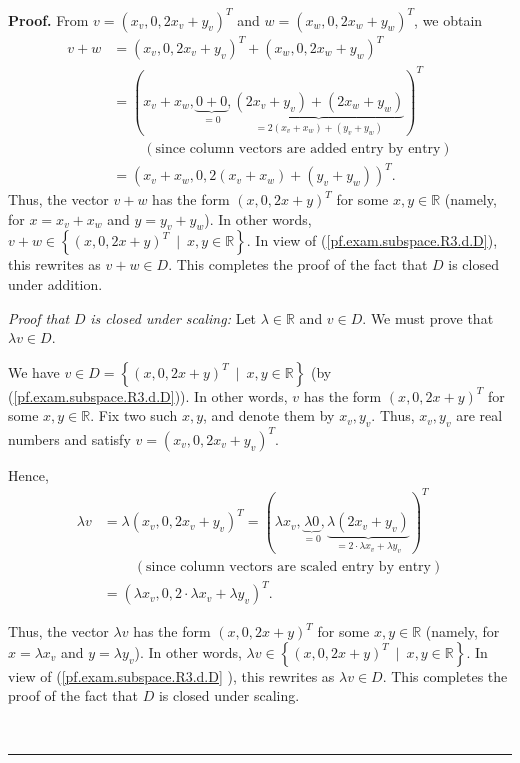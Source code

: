 \documentclass[numbers=enddot,12pt,final,onecolumn,notitlepage]{scrartcl}%
\theoremstyle{definition}
\newenvironment{proof}[1][Proof]{\noindent\textbf{#1.} }{\ \rule{0.5em}{0.5em}}
\begin{document}
\begin{proof}
From $v=\left(  x_{v},0,2x_{v}+y_{v}\right)  ^{T}$ and $w=\left(
x_{w},0,2x_{w}+y_{w}\right)  ^{T}$, we obtain%
\begin{align*}
v+w  &  =\left(  x_{v},0,2x_{v}+y_{v}\right)  ^{T}+\left(  x_{w}%
,0,2x_{w}+y_{w}\right)  ^{T}\\
&  =\left(  x_{v}+x_{w},\underbrace{0+0}_{=0},\underbrace{\left(  2x_{v}%
+y_{v}\right)  +\left(  2x_{w}+y_{w}\right)  }_{=2\left(  x_{v}+x_{w}\right)
+\left(  y_{v}+y_{w}\right)  }\right)  ^{T}\\
&  \ \ \ \ \ \ \ \ \ \ \left(  \text{since column vectors are added entry by
entry}\right) \\
&  =\left(  x_{v}+x_{w},0,2\left(  x_{v}+x_{w}\right)  +\left(  y_{v}%
+y_{w}\right)  \right)  ^{T}.
\end{align*}
Thus, the vector $v+w$ has the form $\left(  x,0,2x+y\right)  ^{T}$ for some
$x,y\in\mathbb{R}$ (namely, for $x=x_{v}+x_{w}$ and $y=y_{v}+y_{w}$). In other
words, $v+w\in\left\{  \left(  x,0,2x+y\right)  ^{T}\ \mid\ x,y\in
\mathbb{R}\right\}  $. In view of (\ref{pf.exam.subspace.R3.d.D}), this
rewrites as $v+w\in D$. This completes the proof of the fact that $D$ is
closed under addition.

\textit{Proof that }$D$ \textit{is closed under scaling:} Let $\lambda
\in\mathbb{R}$ and $v\in D$. We must prove that $\lambda v\in D$.

We have $v\in D=\left\{  \left(  x,0,2x+y\right)  ^{T}\ \mid\ x,y\in
\mathbb{R}\right\}  $ (by (\ref{pf.exam.subspace.R3.d.D})). In other words,
$v$ has the form $\left(  x,0,2x+y\right)  ^{T}$ for some $x,y\in\mathbb{R}$.
Fix two such $x,y$, and denote them by $x_{v},y_{v}$. Thus, $x_{v},y_{v}$ are
real numbers and satisfy $v=\left(  x_{v},0,2x_{v}+y_{v}\right)  ^{T}$.

Hence,%
\begin{align*}
\lambda v  &  =\lambda\left(  x_{v},0,2x_{v}+y_{v}\right)  ^{T}=\left(
\lambda x_{v},\underbrace{\lambda0}_{=0},\underbrace{\lambda\left(
2x_{v}+y_{v}\right)  }_{=2\cdot\lambda x_{v}+\lambda y_{v}}\right)  ^{T}\\
&  \ \ \ \ \ \ \ \ \ \ \left(  \text{since column vectors are scaled entry by
entry}\right) \\
&  =\left(  \lambda x_{v},0,2\cdot\lambda x_{v}+\lambda y_{v}\right)  ^{T}.
\end{align*}


Thus, the vector $\lambda v$ has the form $\left(  x,0,2x+y\right)  ^{T}$ for
some $x,y\in\mathbb{R}$ (namely, for $x=\lambda x_{v}$ and $y=\lambda y_{v}$).
In other words, $\lambda v\in\left\{  \left(  x,0,2x+y\right)  ^{T}%
\ \mid\ x,y\in\mathbb{R}\right\}  $. In view of (\ref{pf.exam.subspace.R3.d.D}%
), this rewrites as $\lambda v\in D$. This completes the proof of the fact
that $D$ is closed under scaling.


\end{proof}
\end{document}
